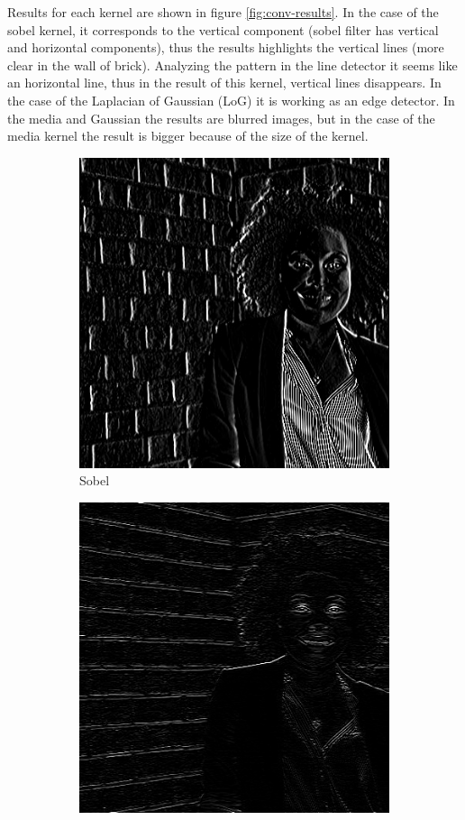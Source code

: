 Results for each kernel are shown in figure \ref{fig:conv-results}. In the case of the sobel kernel, it corresponds to the vertical component (sobel filter has vertical and horizontal components), thus the results highlights the vertical lines (more clear in the wall of brick). Analyzing the pattern in the line detector it seems like an horizontal line, thus in the result of this kernel, vertical lines disappears. In the case of the Laplacian of Gaussian (LoG) it is working as an edge detector. In the media and Gaussian the results are blurred images, but in the case of the media kernel the result is bigger because of the size of the kernel.

\begin{figure}[h!]
\centering
\begin{subfigure}{0.3\textwidth}
  \centering
  \includegraphics[width=0.9\linewidth]{output/sobel.jpg}
  \caption{Sobel}
\end{subfigure}%
\begin{subfigure}{0.3\textwidth}
  \centering
  \includegraphics[width=0.9\linewidth]{output/horizontalLine.jpg}

\end{subfigure}
\end{figure}
